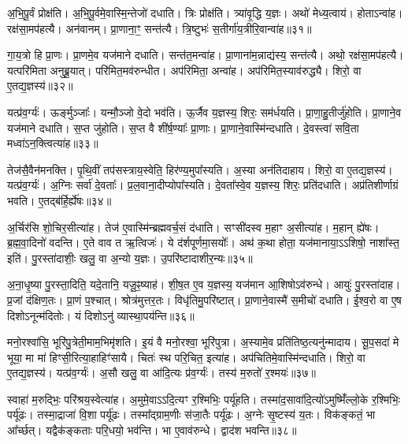 अ॒भि॒पू॒र्वं प्रोक्ष॑ति। 
अ॒भि॒पू॒र्वमे॒वास्मि॒न्तेजो॑ दधाति। 
त्रिः प्रोक्ष॑ति। 
त्र्या॑वृ॒द्धि य॒ज्ञः। 
अथो॑ मेध्य॒त्वाय॑। 
होताऽन्वा॑ह। 
रक्ष॑सा॒मप॑हत्यै। 
अन॑वानम्। 
प्रा॒णाना॒ꣳ॒ सन्त॑त्यै। 
त्रि॒ष्टुभः॑ स॒तीर्गा॑य॒त्रीरि॒वान्वा॑ह॥३१॥

गा॒य॒त्रो हि प्रा॒णः। 
प्रा॒णमे॒व यज॑माने दधाति। 
सन्त॑त॒मन्वा॑ह। 
प्रा॒णाना॑म॒न्नाद्य॑स्य॒ सन्त॑त्यै। 
अथो॒ रक्ष॑सा॒मप॑हत्यै। 
यत्परि॑मिता अनुब्रू॒यात्। 
परि॑मित॒मव॑रुन्धीत। 
अप॑रिमिता॒ अन्वा॑ह। 
अप॑रिमित॒स्याव॑रुद्ध्यै। 
शिरो॒ वा ए॒तद्य॒ज्ञस्य॑॥३२॥

यत्प्र॑व॒र्ग्यः॑। 
ऊर्ङ्मुञ्जाः᳚। 
यन्मौ॒ञ्जो वे॒दो भव॑ति। 
ऊ॒र्जैव य॒ज्ञस्य॒ शिरः॒ सम॑र्धयति। 
प्रा॒णा॒हु॒तीर्जु॑होति। 
प्रा॒णाने॒व यज॑माने दधाति। 
स॒प्त जु॑होति। 
स॒प्त वै शी॑र्\mbox{}ष॒ण्याः᳚ प्रा॒णाः। 
प्रा॒णाने॒वास्मि॑न्दधाति। 
दे॒वस्त्वा॑ सवि॒ता मध्वा॑ऽन॒क्त्वित्या॑ह॥३३॥

तेज॑सै॒वैन॑मनक्ति। 
पृ॒थि॒वीं तप॑सस्त्राय॒स्वेति॒ हिर॑ण्य॒मुपा᳚\-स्यति। 
अ॒स्या अन॑तिदाहाय। 
शिरो॒ वा ए॒तद्य॒ज्ञस्य॑। 
यत्प्र॑व॒र्ग्यः॑। 
अ॒ग्निः सर्वा॑ दे॒वताः᳚। 
प्र॒ल॒वाना॒दीप्योपा᳚स्यति। 
दे॒वता᳚स्वे॒व य॒ज्ञस्य॒ शिरः॒ प्रति॑दधाति। 
अप्र॑तिशीर्णाग्रं भवति। 
ए॒तद्ब॑र्\mbox{}हि॒र्\mbox{}ह्ये॑षः॥३४॥

अ॒र्चिर॑सि शो॒चिर॒सीत्या॑ह। 
तेज॑ ए॒वास्मि॑न्ब्रह्मवर्च॒सं द॑धाति। 
सꣳसी॑दस्व म॒हाꣳ अ॒सीत्या॑ह। 
म॒हान् ह्ये॑षः। 
ब्र॒ह्म॒वा॒दिनो॑ वदन्ति। 
ए॒ते वाव त ऋ॒त्विजः॑। 
ये द॑र्\mbox{}शपूर्णमा॒सयोः᳚। 
अथ॑ क॒था होता॒ यज॑मानाया॒ऽऽशिषो॒ नाशा᳚स्त॒ इति॑। 
पु॒रस्ता॑दाशीः॒ खलु॒ वा अ॒न्यो य॒ज्ञः। 
उ॒परि॑ष्टादाशीर॒न्यः॥३५॥

अ॒ना॒धृ॒ष्या पु॒रस्ता॒दिति॒ यदे॒तानि॒ यजू॒ꣴ॒ष्याह॑। 
शी॒\ar{}\mbox{}ष॒त ए॒व य॒ज्ञस्य॒ यज॑मान आ॒शिषोऽव॑रुन्धे। 
आयुः॑ पु॒रस्ता॑दाह। 
प्र॒जां द॑क्षिण॒तः। 
प्रा॒णं प॒श्चात्। 
श्रोत्र॑मुत्तर॒तः। 
विधृ॑तिमु॒परि॑ष्टात्। 
प्रा॒णाने॒वास्मै॑ स॒मीचो॑ दधाति। 
ई॒श्व॒रो वा ए॒ष दिशोऽनून्म॑दितोः। 
यं दिशोऽनु॑ व्यास्था॒पय॑न्ति॥३६॥

मनो॒रश्वा॑सि॒ भूरि॑पु॒त्रेती॒माम॒भिमृ॑शति। 
इ॒यं वै मनो॒रश्वा॒ भूरि॑पुत्रा। 
अ॒स्यामे॒व प्रति॑तिष्ठ॒त्यनु॑न्मादाय। 
सू॒प॒सदा॑ मे भूया॒ मा मा॑ हिꣳसी॒रित्या॒हाहिꣳ॑सायै। 
चितः॑ स्थ परि॒चित॒ इत्या॑ह। 
अप॑चितिमे॒वास्मि॑न्दधाति। 
शिरो॒ वा ए॒तद्य॒ज्ञस्य॑। 
यत्प्र॑व॒र्ग्यः॑। 
अ॒सौ खलु॒ वा आ॑दि॒त्यः प्र॑व॒र्ग्यः॑। 
तस्य॑ म॒रुतो॑ र॒श्मयः॑॥३७॥

स्वाहा॑ म॒रुद्भिः॒ परि॑श्रय॒स्वेत्या॑ह। 
अ॒मुमे॒वाऽऽदि॒त्यꣳ र॒श्मिभिः॒ पर्यू॑हति। 
तस्मा॑द॒सावा॑दि॒त्यो॑ऽमुष्मिँ॑ल्लो॒के र॒श्मिभिः॒ पर्यू॑ढः। 
तस्मा॒द्राजा॑ वि॒शा पर्यू॑ढः। 
तस्मा᳚द्ग्राम॒णीः स॑जा॒तैः पर्यू॑ढः। 
अ॒ग्नेः सृ॒ष्टस्य॑ य॒तः। 
विक॑ङ्कतं॒ भा आ᳚र्च्छत्। 
यद्वैक॑ङ्कताः परि॒धयो॒ भव॑न्ति। 
भा ए॒वाव॑रुन्धे। 
द्वाद॑श भवन्ति॥३८॥

